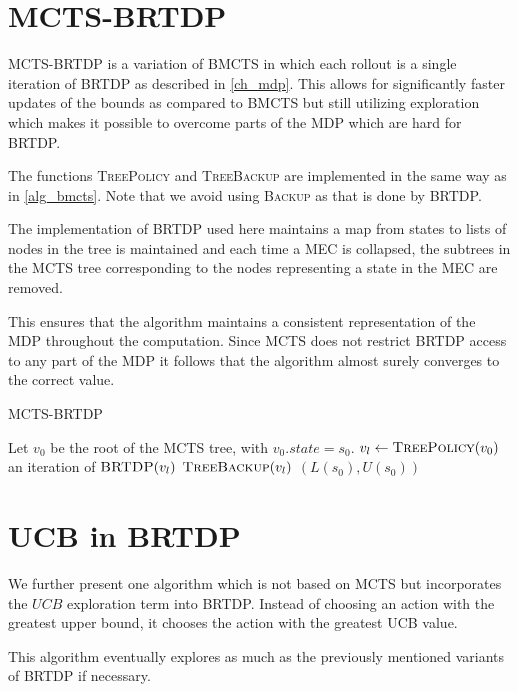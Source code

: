 \section{MCTS-BRTDP}

MCTS-BRTDP is a variation of BMCTS in which each rollout is a
single iteration of BRTDP as described in \autoref{ch_mdp}. This allows
for significantly faster updates of the bounds as compared to BMCTS but
still utilizing exploration which makes it possible to overcome parts of
the MDP which are hard for BRTDP.

The functions \textsc{TreePolicy} and \textsc{TreeBackup} are implemented in
the same way as in \autoref{alg_bmcts}. Note that we avoid using
\textsc{Backup} as that is done by BRTDP.

The implementation of BRTDP used here maintains a map from states to
lists of nodes in the tree is maintained and each time a MEC is
collapsed, the subtrees in the MCTS tree corresponding to the nodes
representing a state in the MEC are removed.

This ensures that the algorithm maintains a consistent representation of
the MDP throughout the computation. Since MCTS does not restrict BRTDP
access to any part of the MDP it follows that the algorithm almost
surely converges to the correct value.

\begin{algorithm}
\caption{MCTS-BRTDP}
\label{mcts-brtdp}
\begin{algorithmic}
    \State Let $v_0$ be the root of the MCTS tree, with $v_0.state = s_0$.
        \State $v_l \gets \Call{TreePolicy}{v_0}$
        \State an iteration of $\Call{BRTDP}{v_l}$
        \State $\Call{TreeBackup}{v_l}$
    \EndWhile
    \State \Return $(L(s_0), U(s_0))$
\EndFunction

\end{algorithmic}
\end{algorithm}

\section{UCB in BRTDP}

We further present one algorithm which is not based on MCTS but
incorporates the $UCB$ exploration term into BRTDP. Instead of choosing
an action with the greatest upper bound, it chooses the action with the
greatest UCB value.

This algorithm eventually explores as much as the previously mentioned
variants of BRTDP if necessary.
